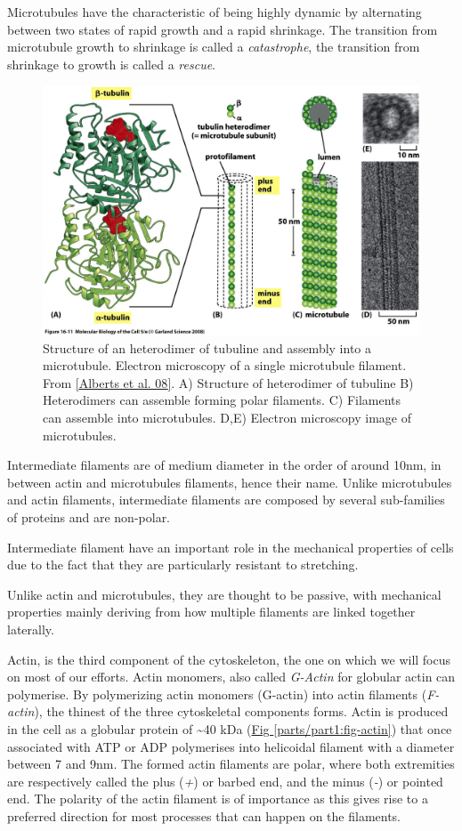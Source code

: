 \documentclass[A4paperpaper,11pt,english]{sphinxmanual}
\begin{document}
Microtubules have the characteristic of being highly dynamic by alternating
between two states of rapid growth and a rapid shrinkage. The transition from
microtubule growth to shrinkage is called a \emph{catastrophe}, the transition from
shrinkage to growth is called a \emph{rescue}.
\begin{figure}[htbp]
\centering
\capstart

\includegraphics[width=0.700\linewidth]{microtubules-structure.jpg}
\caption{Structure of an heterodimer of tubuline and assembly into a microtubule.
Electron microscopy of a single microtubule filament. From {\hyperref[parts/part1:alberts2008]{{[}Alberts et al. 08{]}}}.
A) Structure of heterodimer of tubuline B)
Heterodimers can assemble forming polar filaments. C) Filaments can
assemble into  microtubules. D,E) Electron microscopy image of
microtubules.}\label{parts/part1:fig-mt}\end{figure}

Intermediate filaments are of medium diameter in the order of around 10nm, in
between actin and microtubules filaments, hence their name.  Unlike microtubules
and actin filaments, intermediate filaments are composed by several sub-families
of proteins and are non-polar.

Intermediate filament have an important role in the mechanical properties of
cells due to the fact that they are particularly  resistant to stretching.

Unlike actin and microtubules, they are thought to be passive, with mechanical
properties mainly deriving from how multiple filaments are linked together
laterally.

Actin, is the third component of the cytoskeleton, the one on which  we will
focus on most of our efforts. Actin monomers, also called \emph{G-Actin} for globular actin can polymerise.
By polymerizing actin monomers (G-actin) into actin filaments (\emph{F-actin}), the
thinest of the three cytoskeletal components forms. Actin is produced in the
cell as a globular protein of \textasciitilde{}40 kDa (\hyperref[parts/part1:fig-actin]{Fig  \ref*{parts/part1:fig-actin}}) that once associated with ATP or ADP
polymerises into helicoidal filament with a diameter between 7 and 9nm. The
formed actin filaments are polar, where both extremities are respectively called the
plus (\emph{+}) or barbed end, and the minus (\emph{-}) or pointed end. The polarity of
the actin filament is of importance as this gives rise to a preferred direction
for most processes that can happen on the filaments.
\end{document}
